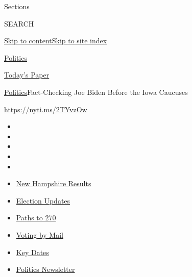 Sections

SEARCH

\protect\hyperlink{site-content}{Skip to
content}\protect\hyperlink{site-index}{Skip to site index}

\href{https://www.nytimes3xbfgragh.onion/section/politics}{Politics}

\href{https://myaccount.nytimes3xbfgragh.onion/auth/login?response_type=cookie\&client_id=vi}{}

\href{https://www.nytimes3xbfgragh.onion/section/todayspaper}{Today's
Paper}

\href{/section/politics}{Politics}\textbar{}Fact-Checking Joe Biden
Before the Iowa Caucuses

\url{https://nyti.ms/2TYvzOw}

\begin{itemize}
\item
\item
\item
\item
\item
\end{itemize}

\begin{itemize}
\item
  \href{https://www.nytimes3xbfgragh.onion/interactive/2020/09/08/us/elections/results-new-hampshire-primary-elections.html?action=click\&pgtype=Article\&state=default\&region=TOP_BANNER\&context=storylines_menu}{New
  Hampshire Results}
\item
  \href{https://www.nytimes3xbfgragh.onion/live/2020/09/08/us/trump-vs-biden?action=click\&pgtype=Article\&state=default\&region=TOP_BANNER\&context=storylines_menu}{Election
  Updates}
\item
  \href{https://www.nytimes3xbfgragh.onion/interactive/2020/us/elections/election-states-biden-trump.html?action=click\&pgtype=Article\&state=default\&region=TOP_BANNER\&context=storylines_menu}{Paths
  to 270}
\item
  \href{https://www.nytimes3xbfgragh.onion/interactive/2020/08/31/us/politics/vote-by-mail-deadlines.html?action=click\&pgtype=Article\&state=default\&region=TOP_BANNER\&context=storylines_menu}{Voting
  by Mail}
\item
  \href{https://www.nytimes3xbfgragh.onion/interactive/2019/us/elections/2020-presidential-election-calendar.html?action=click\&pgtype=Article\&state=default\&region=TOP_BANNER\&context=storylines_menu}{Key
  Dates}
\item
  \href{https://www.nytimes3xbfgragh.onion/newsletters/politics?action=click\&pgtype=Article\&state=default\&region=TOP_BANNER\&context=storylines_menu}{Politics
  Newsletter}
\end{itemize}

